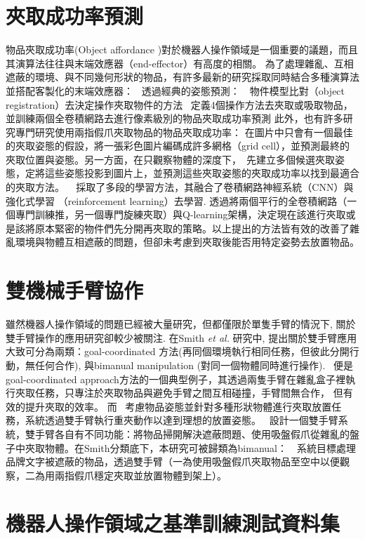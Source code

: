\section{夾取成功率預測}
物品夾取成功率(Object affordance )對於機器人操作領域是一個重要的議題，而且其演算法往往與末端效應器（end-effector）有高度的相關。
為了處理雜亂、互相遮蔽的環境、與不同幾何形狀的物品，有許多最新的研究採取同時結合多種演算法並搭配客製化的末端效應器：
~\cite{zeng2016multi}透過經典的姿態預測：　物件模型比對（object　registration）去決定操作夾取物件的方法
~\cite{zeng2018robotic}定義4個操作方法去夾取或吸取物品，並訓練兩個全卷積網路去進行像素級別的物品夾取成功率預測
此外，也有許多研究專門研究使用兩指假爪夾取物品的物品夾取成功率： \cite{redmon2015real} 在圖片中只會有一個最佳的夾取姿態的假設，將一張彩色圖片編碼成許多網格（grid cell），並預測最終的夾取位置與姿態。另一方面，在只觀察物體的深度下，~\cite{mahler2017dex}先建立多個候選夾取姿態，定將這些姿態投影到圖片上，並預測這些夾取姿態的夾取成功率以找到最適合的夾取方法。
~\cite{pinto2016supersizing} 採取了多段的學習方法，其融合了卷積網路神經系統（CNN）與強化式學習 （reinforcement learning）去學習. \cite{zeng2018learning}透過將兩個平行的全卷積網路（一個專門訓練推，另一個專門旋練夾取）與Q-learning架構，決定現在該進行夾取或是該將原本緊密的物件們先分開再夾取的策略。以上提出的方法皆有效的改善了雜亂環境與物體互相遮蔽的問題，但卻未考慮到夾取後能否用特定姿勢去放置物品。

\section{雙機械手臂協作}
雖然機器人操作領域的問題已經被大量研究，但都僅限於單隻手臂的情況下, 關於雙手臂操作的應用研究卻較少被關注. 在Smith \textit{et al.} \cite{smith2012dual}研究中,
提出關於雙手臂應用大致可分為兩類：goal-coordinated 方法(再同個環境執行相同任務，但彼此分開行動，無任何合作), 與bimanual manipulation (對同一個物體同時進行操作).
~\cite{schwarz2018fast}便是goal-coordinated approach方法的一個典型例子，其透過兩隻手臂在雜亂盒子裡執行夾取任務，只專注於夾取物品與避免手臂之間互相碰撞，手臂間無合作，
但有效的提升夾取的效率。 而~\cite{harada2012pick} 考慮物品姿態並針對多種形狀物體進行夾取放置任務，系統透過雙手臂執行重夾動作以達到理想的放置姿態。
~\cite{miyazaki2017object}設計一個雙手臂系統，雙手臂各自有不同功能：將物品掃開解決遮蔽問題、使用吸盤假爪從雜亂的盤子中夾取物體。在Smith分類底下，本研究可被歸類為bimanual：　系統目標處理品牌文字被遮蔽的物品，透過雙手臂（一為使用吸盤假爪夾取物品至空中以便觀察，二為用兩指假爪穩定夾取並放置物體到架上）。

\section{機器人操作領域之基準訓練測試資料集}
